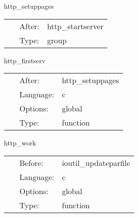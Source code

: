 \vspace{5mm}


\hspace{5mm} http\_setuppages 

\hspace{5mm}{\it group to setup stuff which needs to be done between starting the server and the first time it serves pages } 


\hspace{5mm}

 \begin{tabular*}{160mm}{cll} 
~ & After:  & http\_startserver \\ 
~ & Type:  & group \\ 
\end{tabular*} 


\vspace{5mm}


\hspace{5mm} http\_firstserv 

\hspace{5mm}{\it serve first pages at startup } 


\hspace{5mm}

 \begin{tabular*}{160mm}{cll} 
~ & After:  & http\_setuppages \\ 
~ & Language:  & c \\ 
~ & Options:  & global \\ 
~ & Type:  & function \\ 
\end{tabular*} 


\vspace{5mm}


\hspace{5mm} http\_work 

\hspace{5mm}{\it working routine } 


\hspace{5mm}

 \begin{tabular*}{160mm}{cll} 
~ & Before:  & ioutil\_updateparfile \\ 
~ & Language:  & c \\ 
~ & Options:  & global \\ 
~ & Type:  & function \\ 
\end{tabular*} 


